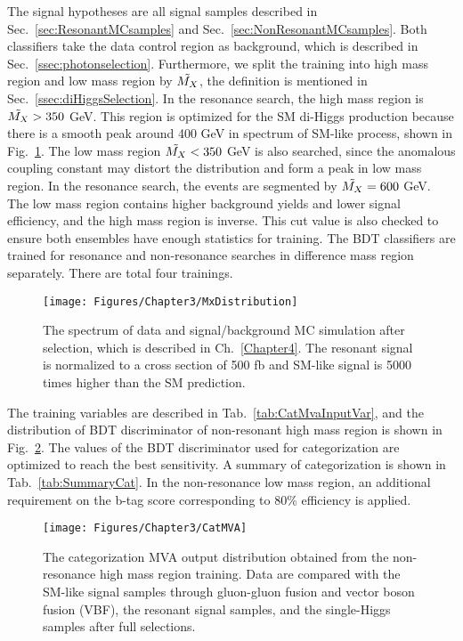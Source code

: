 The signal hypotheses are all signal samples described in Sec.~\ref{sec:ResonantMCsamples} and Sec.~\ref{sec:NonResonantMCsamples}.
Both classifiers take the data control region as background, which is described in Sec.~\ref{ssec:photonselection}.
Furthermore, we split the training into high mass region and low mass region by $\tilde{M_{X}}$, the definition is mentioned in Sec.~\ref{ssec:diHiggsSelection}.
In the resonance search, the high mass region is $\tilde{M_{X}} > 350$ GeV.
This region is optimized for the SM di-Higgs production because there is a smooth peak around 400 GeV in \Mx spectrum of SM-like process, shown in Fig.~\ref{fig:MxDistribution}.
The low mass region $\tilde{M_{X}} < 350$ GeV is also searched, since the anomalous coupling constant may distort the distribution and form a peak in low mass region.
In the resonance search, the events are segmented by $\tilde{M_{X}} = 600$ GeV.
The low mass region contains higher background yields and lower signal efficiency, and the high mass region is inverse.
This cut value is also checked to ensure both ensembles have enough statistics for training. 
The BDT classifiers are trained for resonance and non-resonance searches in difference mass region separately.
There are total four trainings.

\begin{figure}[h]
  \centering
  \texttt{[image: Figures/Chapter3/MxDistribution]}
  \caption{The \Mx spectrum of data and signal/background MC simulation after \HHbbgg selection, which is described in Ch.~\ref{Chapter4}.
  The resonant signal is normalized to a cross section of 500 fb and SM-like signal is 5000 times higher than the SM prediction.}
  \label{fig:MxDistribution}
\end{figure}

The training variables are described in Tab.~\ref{tab:CatMvaInputVar}, and the distribution of BDT discriminator of non-resonant high mass region is shown in Fig.~\ref{fig:CatMVA}.
The values of the BDT discriminator used for categorization are optimized to reach the best sensitivity.
A summary of categorization is shown in Tab.~\ref{tab:SummaryCat}.
In the non-resonance low mass region, an additional requirement on the b-tag score corresponding to 80\% efficiency is applied.

\begin{figure}[h]
  \centering
  \texttt{[image: Figures/Chapter3/CatMVA]}
  \caption{The categorization MVA output distribution obtained from the non-resonance high mass region training. Data are compared with the SM-like signal samples through gluon-gluon fusion and vector boson fusion (VBF), the resonant signal samples, and the single-Higgs samples after full selections.}
  \label{fig:CatMVA}
\end{figure}


